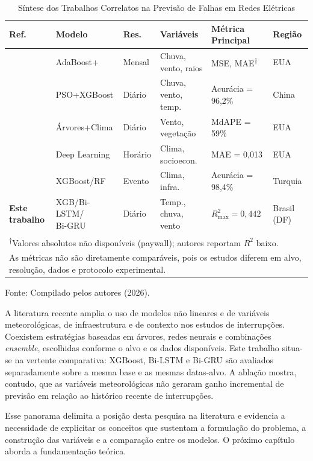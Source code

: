\begin{table}[H]
\caption{Síntese dos Trabalhos Correlatos na Previsão de Falhas em Redes Elétricas}
\label{tab:estado_arte}
\begin{center}
\footnotesize
\begin{tabularx}{\textwidth}{l l l l X l}
\toprule
\textbf{Ref.} & \textbf{Modelo} & \textbf{Res.} & \textbf{Variáveis} & \textbf{Métrica Principal} & \textbf{Região} \\
\midrule
\cite{roque2017weather} & AdaBoost+ & Mensal & Chuva, vento, raios & MSE, MAE\textsuperscript{$\dagger$} & EUA \\
\cite{saha2019machine} & PSO+XGBoost & Diário & Chuva, vento, temp. & Acurácia = 96,2\% & China \\
\cite{smith2021hybrid} & Árvores+Clima & Diário & Vento, vegetação & MdAPE = 59\% & EUA \\
\cite{zhang2023deep} & Deep Learning & Horário & Clima, socioecon. & MAE = 0,013 & EUA \\
\cite{silva2021xgboost} & XGBoost/RF & Evento & Clima, infra. & Acurácia = 98,4\% & Turquia \\
\textbf{Este trabalho} & \shortstack[l]{XGB/Bi-LSTM/\\Bi-GRU} & Diário & Temp., chuva, vento & $R^2_{\max}=0{,}442$ & Brasil (DF) \\
\bottomrule
\multicolumn{6}{l}{\textsuperscript{$\dagger$}\scriptsize{Valores absolutos não disponíveis (paywall); autores reportam $R^2$ baixo.}} \\
\multicolumn{6}{p{0.97\textwidth}}{\scriptsize{As métricas não são diretamente comparáveis, pois os estudos diferem em alvo, resolução, dados e protocolo experimental.}} \\
\end{tabularx}
\normalsize
\end{center}
\small{Fonte: Compilado pelos autores (2026).}
\end{table}

A literatura recente amplia o uso de modelos não lineares e de variáveis meteorológicas, de infraestrutura e de contexto nos estudos de interrupções. Coexistem estratégias baseadas em árvores, redes neurais e combinações \textit{ensemble}, escolhidas conforme o alvo e os dados disponíveis. Este trabalho situa-se na vertente comparativa: XGBoost, Bi-LSTM e Bi-GRU são avaliados separadamente sobre a mesma base e as mesmas datas-alvo. A ablação mostra, contudo, que as variáveis meteorológicas não geraram ganho incremental de previsão em relação ao histórico recente de interrupções.

Esse panorama delimita a posição desta pesquisa na literatura e evidencia a necessidade de explicitar os conceitos que sustentam a formulação do problema, a construção das variáveis e a comparação entre os modelos. O próximo capítulo aborda a fundamentação teórica.
